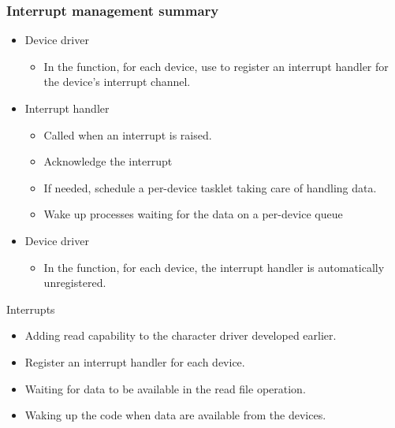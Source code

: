 \begin{frame}
  \frametitle{Interrupt management summary}
  \begin{itemize}
  \item Device driver
    \begin{itemize}
    \item In the  function, for each device,
      use  to register an interrupt handler
      for the device's interrupt channel.
    \end{itemize}
  \item Interrupt handler
    \begin{itemize}
    \item Called when an interrupt is raised.
    \item Acknowledge the interrupt
    \item If needed, schedule a per-device tasklet taking care of handling
      data.
    \item Wake up processes waiting for the data on a per-device queue
    \end{itemize}
  \item Device driver
    \begin{itemize}
    \item In the  function, for each device, the
      interrupt handler is automatically unregistered.
    \end{itemize}
  \end{itemize}
\end{frame}

\setuplabframe
{Interrupts}
{
  \begin{itemize}
  \item Adding read capability to the character driver developed
    earlier.
  \item Register an interrupt handler for each device.
  \item Waiting for data to be available in the read file operation.
  \item Waking up the code when data are available from the devices.
  \end{itemize}
}

